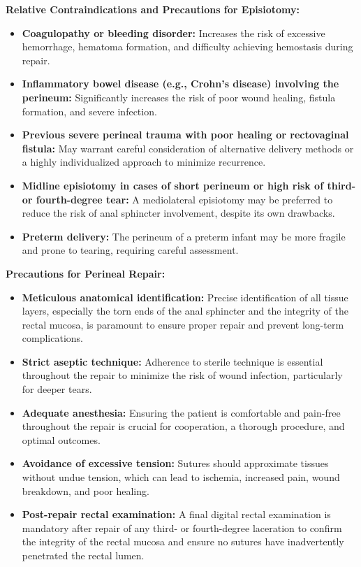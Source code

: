 \textbf{Relative Contraindications and Precautions for Episiotomy:}

\begin{itemize}
  \item \textbf{Coagulopathy or bleeding disorder:} Increases the risk of excessive hemorrhage, hematoma formation, and difficulty achieving hemostasis during repair.
  \item \textbf{Inflammatory bowel disease (e.g., Crohn's disease) involving the perineum:} Significantly increases the risk of poor wound healing, fistula formation, and severe infection.
  \item \textbf{Previous severe perineal trauma with poor healing or rectovaginal fistula:} May warrant careful consideration of alternative delivery methods or a highly individualized approach to minimize recurrence.
  \item \textbf{Midline episiotomy in cases of short perineum or high risk of third- or fourth-degree tear:} A mediolateral episiotomy may be preferred to reduce the risk of anal sphincter involvement, despite its own drawbacks.
  \item \textbf{Preterm delivery:} The perineum of a preterm infant may be more fragile and prone to tearing, requiring careful assessment.
\end{itemize}

\textbf{Precautions for Perineal Repair:}

\begin{itemize}
  \item \textbf{Meticulous anatomical identification:} Precise identification of all tissue layers, especially the torn ends of the anal sphincter and the integrity of the rectal mucosa, is paramount to ensure proper repair and prevent long-term complications.
  \item \textbf{Strict aseptic technique:} Adherence to sterile technique is essential throughout the repair to minimize the risk of wound infection, particularly for deeper tears.
  \item \textbf{Adequate anesthesia:} Ensuring the patient is comfortable and pain-free throughout the repair is crucial for cooperation, a thorough procedure, and optimal outcomes.
  \item \textbf{Avoidance of excessive tension:} Sutures should approximate tissues without undue tension, which can lead to ischemia, increased pain, wound breakdown, and poor healing.
  \item \textbf{Post-repair rectal examination:} A final digital rectal examination is mandatory after repair of any third- or fourth-degree laceration to confirm the integrity of the rectal mucosa and ensure no sutures have inadvertently penetrated the rectal lumen.
\end{itemize}

